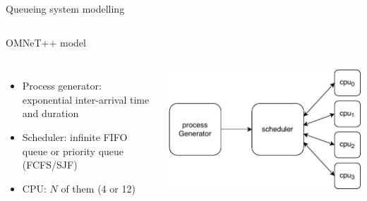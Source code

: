 \documentclass[aspectratio=169,xcolor=dvipsnames]{beamer}
\begin{document}
\begin{frame}{Queueing system modelling}
\begin{columns}[c]
    \end{columns}
\end{frame}


\begin{frame}{OMNeT++ model}
    \begin{columns}[c] %

    \begin{itemize}
        \item Process generator: exponential inter-arrival time and duration
        \item Scheduler: infinite FIFO queue or priority queue (FCFS/SJF)
        \item CPU: $N$ of them (4 or 12)
    \end{itemize}

    \includegraphics[width=\textwidth]{files/Computer.pdf} %
\end{columns}
    
\end{frame}

\end{document}
